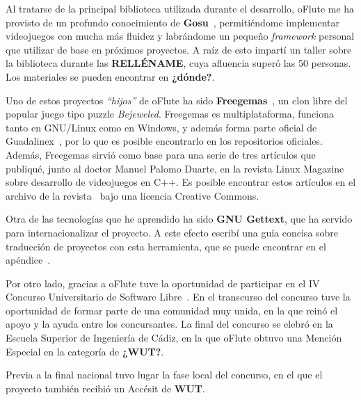 Al tratarse de la principal biblioteca utilizada durante el desarrollo, oFlute
me ha provisto de un profundo conocimiento de \textbf{Gosu}~\cite{gosu},
permitiéndome implementar videojuegos con mucha más fluidez y labrándome un
pequeño \textit{framework} personal que utilizar de base en próximos
proyectos. A raíz de esto impartí un taller sobre la biblioteca durante las
{\Large\textbf{RELLÉNAME}}, cuya afluencia superó las 50 personas. Los materiales
  se pueden encontrar en {\Large\textbf{¿dónde?}}.

Uno de estos proyectos \textit{``hijos''} de oFlute ha sido
\textbf{Freegemas}~\cite{freegemas}, un clon libre del popular juego tipo puzzle
\textit{Bejeweled}. Freegemas es multiplataforma, funciona tanto en GNU/Linux
como en Windows, y además forma parte oficial de Guadalinex~\cite{guadalinex},
por lo que es posible encontrarlo en los repositorios oficiales. Además,
Freegemas sirvió como base para una serie de tres artículos que publiqué, junto
al doctor Manuel Palomo Duarte, en la revista Linux
Magazine~\cite{linuxmagazine} sobre desarrollo de videojuegos en C++. Es posible
encontrar estos artículos en el archivo de la
revista~\cite{refarticulo1}\cite{refarticulo2}\cite{refarticulo3} bajo una
licencia Creative Commons.

Otra de las tecnologías que he aprendido ha sido \textbf{GNU Gettext}, que ha
servido para internacionalizar el proyecto. A este efecto escribí una guía
concisa sobre traducción de proyectos con esta herramienta, que se puede
encontrar en el apéndice~\textit{}.

Por otro lado, gracias a oFlute tuve la oportunidad de participar en el IV
Concurso Universitario de Software Libre~\cite{cusl}. En el transcurso del
concurso tuve la oportunidad de formar parte de una comunidad muy unida, en la
que reinó el apoyo y la ayuda entre los concursantes. La final del concurso se
elebró en la Escuela Superior de Ingeniería de Cádiz, en la que oFlute obtuvo
una Mención Especial en la categoría de {\Large\textbf{¿WUT?}}.

Previa a la final nacional tuvo lugar la fase local del concurso, en el que
el proyecto también recibió un Accésit de {\Large\textbf{WUT}}.
